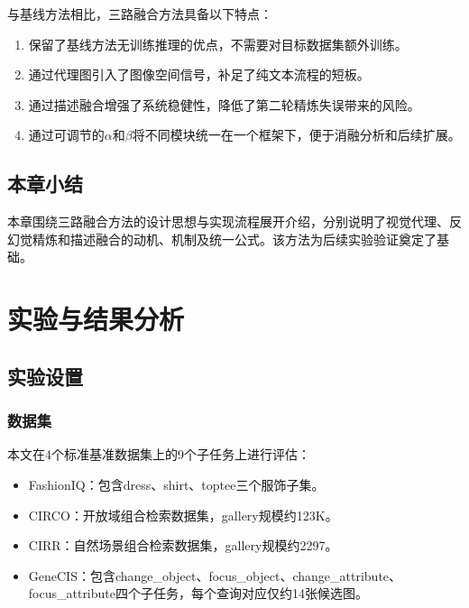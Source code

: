 \documentclass[12pt,a4paper,UTF8,oneside,openany]{ctexrep}
\begin{document}
与基线方法相比，三路融合方法具备以下特点：
\begin{enumerate}[leftmargin=2\ccwd]
  \item 保留了基线方法无训练推理的优点，不需要对目标数据集额外训练。
  \item 通过代理图引入了图像空间信号，补足了纯文本流程的短板。
  \item 通过描述融合增强了系统稳健性，降低了第二轮精炼失误带来的风险。
  \item 通过可调节的$\alpha$和$\beta$将不同模块统一在一个框架下，便于消融分析和后续扩展。
\end{enumerate}

\section{本章小结}

本章围绕三路融合方法的设计思想与实现流程展开介绍，分别说明了视觉代理、反幻觉精炼和描述融合的动机、机制及统一公式。该方法为后续实验验证奠定了基础。


\chapter{实验与结果分析}

\section{实验设置}

\subsection{数据集}

本文在4个标准基准数据集上的9个子任务上进行评估：
\begin{itemize}[leftmargin=2\ccwd]
  \item FashionIQ\cite{wu2021fashioniq}：包含dress、shirt、toptee三个服饰子集。
  \item CIRCO\cite{baldrati2022conditioned}：开放域组合检索数据集，gallery规模约123K。
  \item CIRR\cite{liu2021image}：自然场景组合检索数据集，gallery规模约2297。
  \item GeneCIS\cite{vaze2023genecis}：包含change\_object、focus\_object、change\_attribute、focus\_attribute四个子任务，每个查询对应仅约14张候选图。
\end{itemize}
\end{document}
